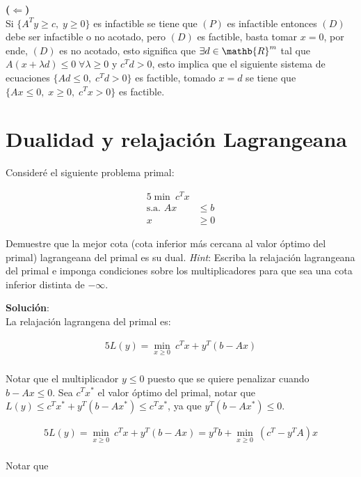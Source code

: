 \documentclass[10pt]{article}
\theoremstyle{plain}
\theoremstyle{definition}
\begin{document}
\textbf{($\Longleftarrow$)}\\
Si $\{A^{T}y\geq c, \; y\geq0\}$ es infactible se tiene que $(P)$ es infactible entonces $(D)$ debe ser infactible o no acotado, pero $(D)$ es factible, basta tomar $x=0$, por ende, $(D)$ es no acotado, esto significa que $\exists d\in\mathb{R}^{m}$ tal que $A(x+\lambda d)\leq0 \; \forall \lambda\geq0$ y $c^{T}d > 0$, esto implica que el siguiente sistema de ecuaciones $\{Ad\leq0, \;c^{T}d > 0\}$ es factible, tomado $x=d$ se tiene que $\{Ax\leq0, \; x\geq0, \; c^{T}x>0\}$ es factible.

\section{Dualidad y relajación Lagrangeana}
Consideré el siguiente problema primal:

\begin{center}
\begin{alignat*}{5}
\min\  c^{T}x\\
\text{s.a. }  Ax&\leq b\\
x&\geq 0
\end{alignat*}
\end{center}
Demuestre que la mejor cota (cota inferior más cercana al valor óptimo del primal) lagrangeana del primal es su dual. \textit{Hint}: Escriba la relajación lagrangeana del primal e imponga condiciones sobre los multiplicadores para que sea una cota inferior distinta de $-\infty$.

\textbf{Solución}:\\
La relajación lagrangena del primal es:
\begin{center}
\begin{alignat*}{5}
L(y)= \underset{x\geq0}{\min}\  c^{T}x+y^{T}(b-Ax)\\
\end{alignat*}
\end{center}

Notar que el multiplicador $y\leq0$ puesto que se quiere penalizar cuando $b-Ax\leq0$. Sea $c^{T}x^{*}$ el valor óptimo del primal, notar que $L(y)\leq c^{T}x^{*}+y^{T}(b-Ax^{*})\leq c^{T}x^{*}$, ya que $y^{T}(b-Ax^{*})\leq0$.
\begin{center}
\begin{alignat*}{5}
L(y)= \underset{x\geq0}{\min}\  c^{T}x+y^{T}(b-Ax)=y^{T}b+\underset{x\geq0}{\min}\ (c^{T}-y^{T}A)x\\
\end{alignat*}
\end{center}
Notar que \\
\end{document}
